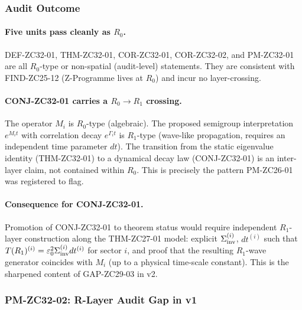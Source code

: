 \documentclass[12pt, a4paper]{article}
\begin{document}
\subsubsection{Audit Outcome}

\paragraph{Five units pass cleanly as $R_0$.}
DEF-ZC32-01, THM-ZC32-01, COR-ZC32-01, COR-ZC32-02, and
PM-ZC32-01 are all $R_0$-type or non-spatial (audit-level)
statements. They are consistent with FIND-ZC25-12
(Z-Programme lives at $R_0$) and incur no layer-crossing.

\paragraph{CONJ-ZC32-01 carries a $R_0 \to R_1$ crossing.}
The operator $M_i$ is $R_0$-type (algebraic). The proposed
semigroup interpretation $e^{M_i t}$ with correlation decay
$e^{\Gamma_i t}$ is $R_1$-type (wave-like propagation,
requires an independent time parameter $dt$). The transition
from the static eigenvalue identity (THM-ZC32-01) to a
dynamical decay law (CONJ-ZC32-01) is an inter-layer claim,
not contained within $R_0$. This is precisely the pattern
PM-ZC26-01 was registered to flag.

\paragraph{Consequence for CONJ-ZC32-01.}
Promotion of CONJ-ZC32-01 to theorem status would require
independent $R_1$-layer construction along the THM-ZC27-01
model: explicit $\Sigma_{\rm inv}^{(i)}$, $dt^{(i)}$ such
that $T(R_1)^{(i)} = \varepsilon_0^2 \Sigma_{\rm inv}^{(i)}
dt^{(i)}$ for sector $i$, and proof that the resulting
$R_1$-wave generator coincides with $M_i$ (up to a physical
time-scale constant). This is the sharpened content of
GAP-ZC29-03 in v2.

\subsubsection{PM-ZC32-02: R-Layer Audit Gap in v1}
\end{document}
